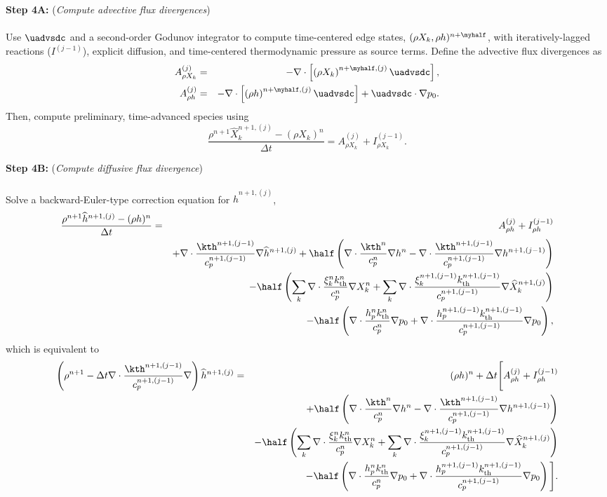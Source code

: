{\bf Step 4A:} ({\it Compute advective flux divergences})\\ \\
Use $\uadvsdc$ and a second-order Godunov integrator to compute time-centered edge states, $(\rho X_k, \rho h)^{n+\myhalf}$, with iteratively-lagged reactions ($I^{(j-1)}$), explicit diffusion, and time-centered thermodynamic pressure as source terms.  Define the advective flux divergences as
\begin{eqnarray}
A_{\rho X_k}^{(j)} &=& -\nabla\cdot\left[\left(\rho X_k\right)^{n+\myhalf,(j)}\uadvsdc\right],\\
A_{\rho h}^{(j)} &=& -\nabla\cdot\left[\left(\rho h\right)^{n+\myhalf,(j)}\uadvsdc\right] + \uadvsdc\cdot\nabla p_0.
\end{eqnarray}
Then, compute preliminary, time-advanced species using
\begin{equation}
\frac{\rho^{n+1}\widehat{X}_k^{n+1,(j)} - (\rho X_k)^n}{\Delta t} = A_{\rho X_k}^{(j)} + I_{\rho X_k}^{(j-1)}.\label{eq:sdc species 3}
\end{equation}

{\bf Step 4B:} ({\it Compute diffusive flux divergence})\\ \\
Solve a backward-Euler-type correction equation for $\widehat{h}^{n+1,(j)}$,
\begin{eqnarray}
\frac{\rho^{n+1}\widehat{h}^{n+1,(j)} - (\rho h)^n}{\Delta t} &=& A_{\rho h}^{(j)} + I_{\rho h}^{(j-1)}\nonumber\\
&& + \nabla\cdot\frac{\kth^{n+1,(j-1)}}{c_p^{n+1,(j-1)}}\nabla\widehat{h}^{n+1,(j)} + \half\left(\nabla\cdot\frac{\kth^n}{c_p^n}\nabla h^n - \nabla\cdot\frac{\kth^{n+1,(j-1)}}{c_p^{n+1,(j-1)}}\nabla h^{n+1,(j-1)}\right)\nonumber\\
&& - \half\left(\sum_k\nabla\cdot\frac{\xi_k^n k_{\rm th}^n}{c_p^n}\nabla X_k^n + \sum_k\nabla\cdot\frac{\xi_k^{n+1,(j-1)} k_{\rm th}^{n+1,(j-1)}}{c_p^{n+1,(j-1)}}\nabla\widehat{X}_k^{n+1,(j)}\right)\nonumber\\
&& - \half\left(\nabla\cdot\frac{h_p^n k_{\rm th}^n}{c_p^n}\nabla p_0 + \nabla\cdot\frac{h_p^{n+1,(j-1)}k_{\rm th}^{n+1,(j-1)}}{c_p^{n+1,(j-1)}}\nabla p_0\right),\label{eq:sdc enthalpy 3}
\end{eqnarray}
which is equivalent to
\begin{eqnarray}
\left(\rho^{n+1} - \Delta t\nabla\cdot\frac{\kth^{n+1,(j-1)}}{c_p^{n+1,(j-1)}}\nabla\right)\widehat{h}^{n+1,(j)} &=& (\rho h)^n + \Delta t\Bigg[A_{\rho h}^{(j)} + I_{\rho h}^{(j-1)} \nonumber\\
&& + \half\left(\nabla\cdot\frac{\kth^n}{c_p^n}\nabla h^n - \nabla\cdot\frac{\kth^{n+1,(j-1)}}{c_p^{n+1,(j-1)}}\nabla h^{n+1,(j-1)}\right)\nonumber\\
&& - \half\left(\sum_k\nabla\cdot\frac{\xi_k^n k_{\rm th}^n}{c_p^n}\nabla X_k^n + \sum_k\nabla\cdot\frac{\xi_k^{n+1,(j-1)} k_{\rm th}^{n+1,(j-1)}}{c_p^{n+1,(j-1)}}\nabla\widehat{X}_k^{n+1,(j)}\right)\nonumber\\
&& - \half\left(\nabla\cdot\frac{h_p^n k_{\rm th}^n}{c_p^n}\nabla p_0 + \nabla\cdot\frac{h_p^{n+1,(j-1)}k_{\rm th}^{n+1,(j-1)}}{c_p^{n+1,(j-1)}}\nabla p_0\right)\Bigg].
\end{eqnarray}

